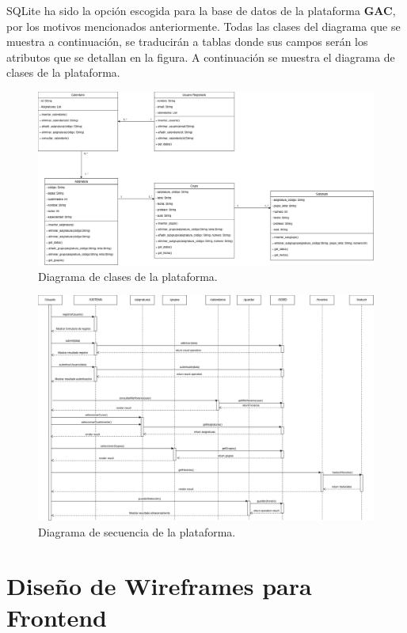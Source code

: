 SQLite ha sido la opción escogida para la base de datos de la plataforma \textbf{GAC}, por los motivos mencionados anteriormente. Todas las clases del diagrama que se muestra a continuación, se traducirán a tablas donde sus campos serán los atributos que se detallan en la figura. A continuación se muestra el diagrama de clases de la plataforma.\newline

\begin{figure}[H]
    \centering
    \includegraphics[width=1\textwidth]{./imagenes/Class_Diagram.png}
    \caption{Diagrama de clases de la plataforma.}
\end{figure}

\begin{figure}[H]
    \centering
    \includegraphics[width=1\textwidth]{./imagenes/Secuencia_Diagrama.png}
    \caption{Diagrama de secuencia de la plataforma.}
\end{figure}



\section{Diseño de Wireframes para Frontend}

